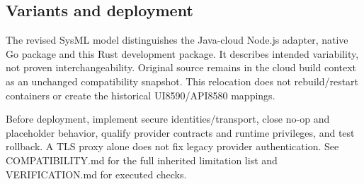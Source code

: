 \documentclass[a4paper]{arrowhead}
\begin{document}
\subsection{Variants and deployment}
\par
The revised SysML model distinguishes the Java-cloud Node.js adapter, native Go package and this Rust development package. It describes intended variability, not proven interchangeability. Original source remains in the cloud build context as an unchanged compatibility snapshot. This relocation does not rebuild/restart containers or create the historical UI8590/API8580 mappings.
\par
Before deployment, implement secure identities/transport, close no-op and placeholder behavior, qualify provider contracts and runtime privileges, and test rollback. A TLS proxy alone does not fix legacy provider authentication. See COMPATIBILITY.md for the full inherited limitation list and VERIFICATION.md for executed checks.
\clearpage
\end{document}
